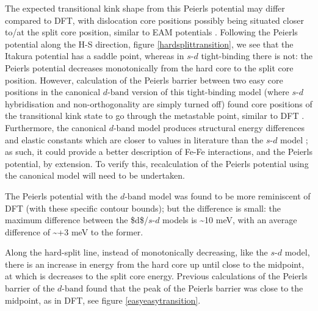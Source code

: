 \documentclass[a4paper,11pt]{article}
\begin{document}
The expected transitional kink shape from this Peierls potential may differ compared to DFT, with
dislocation core positions possibly being situated closer to/at the split core position, similar
to EAM potentials \cite{Itakura2012}. Following the Peierls potential along the H-S direction,
figure \ref{hardsplittransition}, we see that the Itakura potential has a saddle point, whereas in
\(s\text{-}d\) tight-binding there is not: the Peierls potential decreases monotonically
from the hard core to the split core position. However, calculation of the Peierls barrier between
two easy core positions in the canonical \(d\text{-band}\) version of this tight-binding model
(where \(s\text{-}d\) hybridisation and non-orthogonality are simply turned off) found core
positions of the transitional kink state to go through the metastable point, similar to DFT
\cite{Simpson2019}. Furthermore, the canonical \(d\text{-band}\) model produces structural energy
differences and elastic constants which are closer to values in literature than the \(s\text{-}d\) model
\cite{Paxton2010}; as such, it could provide a better description of Fe-Fe interactions, and the
Peierls potential, by extension. To verify this, recalculation of the Peierls potential using the
canonical model will need to be undertaken.


The Peierls potential with the \(d\text{-band}\) model was found to be more reminiscent of
DFT (with these specific contour bounds); but the difference is small: the
maximum difference between the \$d\$/\(s\text{-}d\) models is \textasciitilde{}10 meV, with an average
difference of \textasciitilde{}+3 meV to the former.

Along the hard-split line, instead of monotonically decreasing, like the
\(s\text{-}d\) model, there is an increase in energy from the hard core up until
close to the midpoint, at which is decreases to the split core
energy. Previous calculations of the Peierls barrier of the \(d{\text{-band}}\)
found that the peak of the Peierls barrier was close to the midpoint, as in
DFT, see figure \ref{easyeasytransition}.
\end{document}
